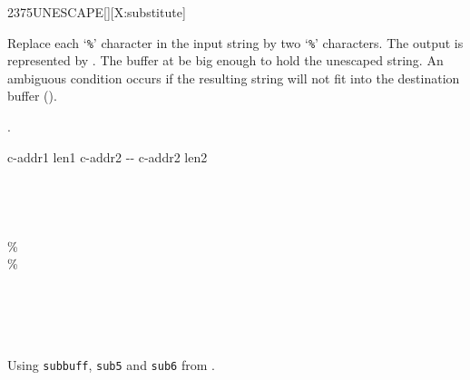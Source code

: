 \begin{worddef}{2375}{UNESCAPE}[][X:substitute]
\item {}

	Replace each `\texttt{\%}' character in the input string
	 by two `\texttt{\%}' characters.  The output
	is represented by .  The buffer at 
	 be big enough to hold the unescaped string.  An ambiguous
	condition occurs if the resulting string will not fit into the
	destination buffer ().

\see {}.

	\begin{implement}
		\word{:}   c-addr1 len1 c-addr2 -{}- c-addr2 len2 \\
		  \\
		  \\
		  \\
		\tab {}    \word{+}   \\
		\tab[2]   \word{[CHAR]} \% \word{=}  \\
		\tab[3] \word{[CHAR]} \%    \\
		\tab[2]  \\
		\tab[2]      \\
		\tab {} \\
		\tab {} \word{-} \\
		\word{;}
	\end{implement}

	\begin{testing}
		Using \texttt{subbuff}, \texttt{sub5} and \texttt{sub6} from .

	\end{testing}
\end{worddef}
\endinput
